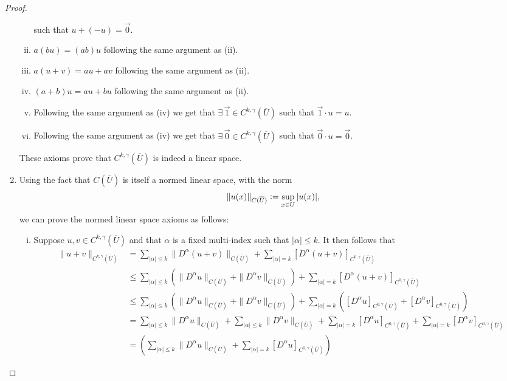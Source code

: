 \documentclass[11pt]{article}
\newcommand{\defeq}{\vcentcolon=}
\begin{document}
\begin{proof}
\begin{enumerate}[1.]
\begin{enumerate}[(i)]
					such that $u+(-u) = \vec{0}$.
				\item $a(bu) = (ab)u$ following the same argument as (ii).
				\item $a(u + v) = au + av$ following the same argument as (ii).
				\item $(a+b)u = au + bu$ following the same argument as (ii).
				\item Following the same argument as (iv) we get that $\exists \, \vec{1} \in C^{k,\gamma}(\overline{U})$
					such that $\vec{1} \cdot u = u$.
				\item Following the same argument as (iv) we get that $\exists \, \vec{0} \in C^{k,\gamma}(\overline{U})$
					such that $\vec{0} \cdot u = \vec{0}$.
			\end{enumerate}
			These axioms prove that $C^{k,\gamma}(\overline{U})$ is indeed a linear space.
		\item Using the fact that $C(\overline{U})$ is itself a normed linear space, with the norm
			\[\|u(x)\|_{C(\overline{U})} \defeq \sup_{x \in U}{|u(x)|},\]
			we can prove the normed linear space axioms as follows:
			\begin{enumerate}[(i)]
				\item Suppose $u,v \in C^{k,\gamma}(\overline{U})$ and that $\alpha$ is a fixed multi-index
					such that $|\alpha| \leq k$. It then follows that
					\begin{align}
						\|u+v\|_{C^{k,\gamma}(\overline{U})} &= \sum_{|\alpha| \leq k}\|D^{\alpha}(u+v)\|_{C(\overline{U})}
											+ \sum_{|\alpha| = k}[D^{\alpha}(u+v)]_{C^{0,\gamma}(\overline{U})} \\
						&\leq \sum_{|\alpha| \leq k}(\|D^{\alpha}u\|_{C(\overline{U})} + \|D^{\alpha}v\|_{C(\overline{U})})
						    + \sum_{|\alpha| = k}[D^{\alpha}(u+v)]_{C^{0,\gamma}(\overline{U})}\\
						&\leq \sum_{|\alpha| \leq k}(\|D^{\alpha}u\|_{C(\overline{U})} + \|D^{\alpha}v\|_{C(\overline{U})})
						    + \sum_{|\alpha| = k}([D^{\alpha}u]_{C^{0,\gamma}(\overline{U})} + [D^{\alpha}v]_{C^{0,\gamma}(\overline{U})})\\
						&= \sum_{|\alpha| \leq k}\|D^{\alpha}u\|_{C(\overline{U})} + \sum_{|\alpha| \leq k}\|D^{\alpha}v\|_{C(\overline{U})}
						    + \sum_{|\alpha| = k}[D^{\alpha}u]_{C^{0,\gamma}(\overline{U})} + \sum_{|\alpha| = k}[D^{\alpha}v]_{C^{0,\gamma}(\overline{U})}\\
						&= (\sum_{|\alpha| \leq k}\|D^{\alpha}u\|_{C(\overline{U})} +  \sum_{|\alpha| = k}[D^{\alpha}u]_{C^{0,\gamma}(\overline{U})})

\end{align}
\end{enumerate}
\end{enumerate}
\end{proof}
\end{document}
